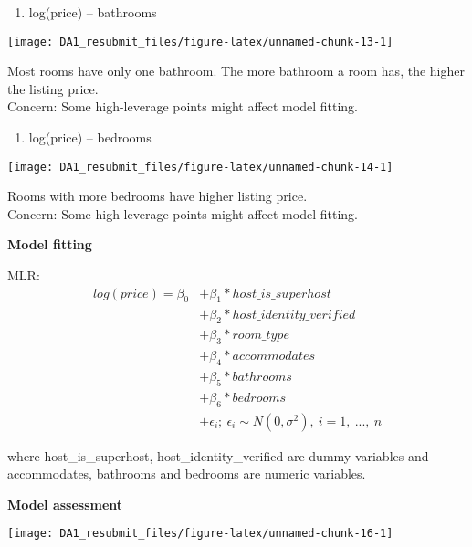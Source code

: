 \documentclass[
]{article}
\providecommand{\tightlist}{%
  \setlength{\itemsep}{0pt}\setlength{\parskip}{0pt}}
\begin{document}
\begin{enumerate}
\def\labelenumi{\arabic{enumi}.}
\setcounter{enumi}{5}
\tightlist
\item
  log(price) -- bathrooms
\end{enumerate}

\begin{center}\texttt{[image: DA1\_resubmit\_files/figure-latex/unnamed-chunk-13-1]} \end{center}

Most rooms have only one bathroom. The more bathroom a room has, the
higher the listing price.\\
Concern: Some high-leverage points might affect model fitting.

\begin{enumerate}
\def\labelenumi{\arabic{enumi}.}
\setcounter{enumi}{6}
\tightlist
\item
  log(price) -- bedrooms
\end{enumerate}

\begin{center}\texttt{[image: DA1\_resubmit\_files/figure-latex/unnamed-chunk-14-1]} \end{center}

Rooms with more bedrooms have higher listing price.\\
Concern: Some high-leverage points might affect model fitting.

\textbf{Model fitting}

MLR: \begin{equation}
\begin{split}
log(price) = \beta_0 
& + \beta_1 * host\_is\_superhost  \\
& + \beta_2 * host\_identity\_verified  \\
& + \beta_3 * room\_type  \\
& + \beta_4 * accommodates  \\
& + \beta_5 * bathrooms  \\
& + \beta_6 * bedrooms \\
& + \epsilon_i; ~ \epsilon_i\sim N(0, \sigma^2),~i = 1,~...,~n 
\end{split}
\end{equation}

where host\_is\_superhost, host\_identity\_verified are dummy variables
and accommodates, bathrooms and bedrooms are numeric variables.

\textbf{Model assessment}

\begin{center}\texttt{[image: DA1\_resubmit\_files/figure-latex/unnamed-chunk-16-1]} \end{center}
\end{document}

